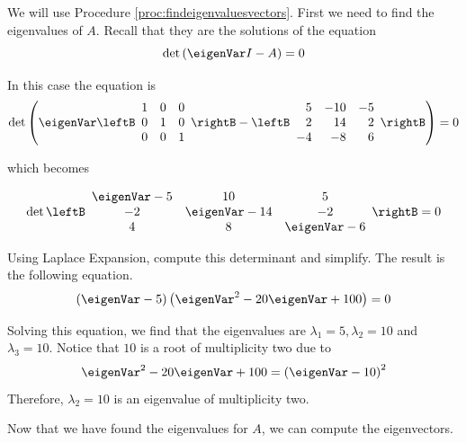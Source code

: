 \begin{solution}
We will use Procedure \ref{proc:findeigenvaluesvectors}.
First we need to find the eigenvalues of $A$. Recall that they are the
solutions of the equation
\begin{equation*}
\det \left( \eigenVar I - A \right) =0
\end{equation*}

In this case the equation is
\begin{equation*}
\det \left( 
\eigenVar \leftB
\begin{array}{rrr}
1 & 0 & 0 \\
0 & 1 & 0 \\
0 & 0 & 1
\end{array}
\rightB
-
\leftB
\begin{array}{rrr}
5 & -10 & -5 \\
2 & 14 & 2 \\
-4 & -8 & 6
\end{array}
\rightB  \right) =0
\end{equation*}

which becomes

\begin{equation*}
\det \leftB
\begin{array}{ccc}
\eigenVar - 5 & 10 & 5 \\
-2 & \eigenVar - 14  & -2 \\
4 & 8 & \eigenVar - 6
\end{array}
\rightB = 0
\end{equation*}

Using Laplace Expansion, compute this determinant and simplify.
The result is the following equation.
\begin{equation*}
\left( \eigenVar -5\right) \left( \eigenVar ^{2}-20\eigenVar +100\right) =0
\end{equation*}

Solving this equation, we find that the eigenvalues are $\lambda_1 = 5, \lambda_2=10$ and
$\lambda_3=10$. Notice that $10$ is a root of multiplicity two due to
\begin{equation*}
\eigenVar ^{2}-20\eigenVar +100=\left( \eigenVar -10\right) ^{2}
\end{equation*}
Therefore, $\lambda_2 = 10$ is an eigenvalue of multiplicity two. 

Now that we have found the eigenvalues for $A$, we can compute the eigenvectors.


\end{solution}
